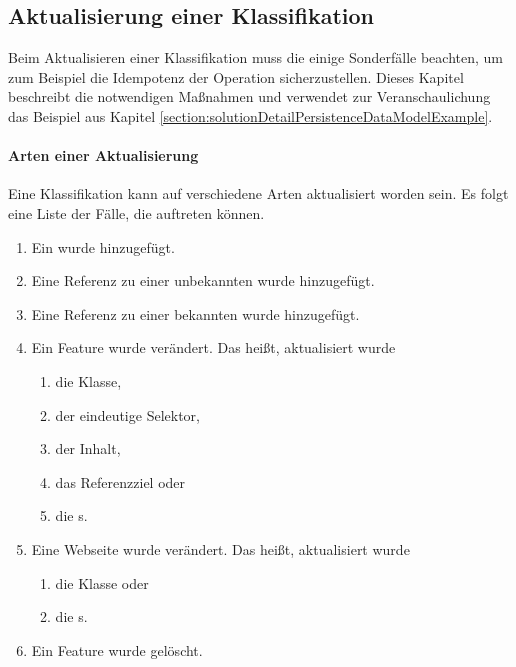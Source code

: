 \subsection{Aktualisierung einer Klassifikation}
    \label{section:solutionDetailsClassificationStorageAPIUpdatePage}
    Beim Aktualisieren einer Klassifikation muss die {\classificationStorageAPI}
    einige Sonderfälle beachten,
    um zum Beispiel die Idempotenz der Operation sicherzustellen.
    Dieses Kapitel beschreibt die notwendigen Maßnahmen und verwendet
    zur Veranschaulichung das Beispiel
    aus Kapitel \ref{section:solutionDetailPersistenceDataModelExample}.

    \paragraph{Arten einer Aktualisierung}
    Eine Klassifikation kann auf verschiedene Arten aktualisiert worden sein.
    Es folgt eine Liste der Fälle, die auftreten können.

    \begin{enumerate}
        \item Ein {\contentFeature} wurde hinzugefügt.
        \item Eine Referenz zu einer unbekannten {\resource} wurde hinzugefügt.
        \item Eine Referenz zu einer bekannten {\resource} wurde hinzugefügt.
        \item Ein Feature wurde verändert. Das heißt, aktualisiert wurde
                \begin{enumerate}
                    \item die Klasse,
                    \item der eindeutige Selektor,
                    \item der Inhalt,
                    \item das Referenzziel oder
                    \item die {\childFeature}s.
                \end{enumerate}
        \item Eine Webseite wurde verändert. Das heißt, aktualisiert wurde
            \begin{enumerate}
                \item die Klasse oder
                \item die {\childFeature}s.
            \end{enumerate}
        \item Ein Feature wurde gelöscht.
    \end{enumerate}

